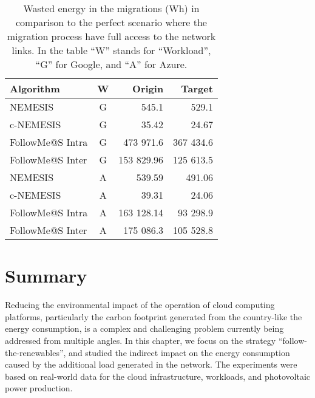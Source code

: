 \begin{table}[!ht]

\caption{Wasted energy in the migrations (Wh) in comparison to the perfect scenario where the migration process have full access to the network links. In the table ``W'' stands for ``Workload'', ``G'' for Google, and ``A'' for Azure.}\label{tab:wasted_mig} \centering
\begin{tabular}{|l|c|r|r|}
  \hline
  \textbf{Algorithm} & \textbf{W}  & \textbf{Origin} & \textbf{Target}   \\
  \hline
  NEMESIS  & G & 545.1  & 529.1 \\
  \hline
  c-NEMESIS & G & 35.42  & 24.67 \\
  \hline
  FollowMe@S Intra & G & 473 971.6 & 367 434.6 \\
  \hline
  FollowMe@S Inter & G & 153 829.96  & 125 613.5  \\
  \hline
  NEMESIS  & A & 539.59  & 491.06 \\
  \hline
  c-NEMESIS & A &  39.31 & 24.06   \\
  \hline
  FollowMe@S Intra & A & 163 128.14  & 93 298.9  \\
  \hline
  FollowMe@S Inter & A & 175 086.3  & 105 528.8 \\
  \hline

\end{tabular}
\end{table}


\section{Summary} \label{sec:conclusion_smargreens}


Reducing the environmental impact of the operation of cloud computing platforms, particularly the carbon footprint generated from the country-like the energy consumption, is a complex and challenging problem currently being addressed from multiple angles. In this chapter, we focus on the strategy ``follow-the-renewables'', and studied the indirect impact on the energy consumption caused by the additional load generated in the network. The experiments were based on real-world data for the cloud infrastructure, workloads, and photovoltaic power production.

